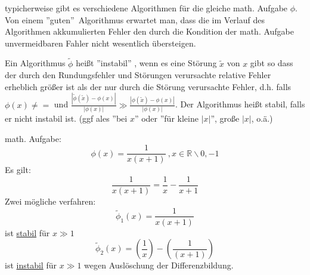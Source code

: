 \documentclass[../Skript.tex]{subfiles}
\begin{document}
\begin{remark} typicherweise gibt es verschiedene Algorithmen für die gleiche math. Aufgabe $\phi$. Von einem ''guten''\ Algorithmus erwartet man, dass die im Verlauf des Algorithmen akkumulierten Fehler den durch die Kondition der math. Aufgabe unvermeidbaren Fahler nicht wesentlich übersteigen.
\end{remark}
\begin{definition}
     Ein Algorithmus $\tilde{\phi}$ heißt ''instabil'' , wenn es eine Störung $\tilde{x}$ von $x$ gibt so dass der durch den Rundungsfehler und Störungen verursachte relative Fehler erheblich größer ist als der nur durch die Störung verursachte Fehler, d.h. falls $\phi(x) \neq = $ und $\displaystyle\frac{|\tilde{\phi}(\tilde{x})-\phi(x)|}{|\phi(x)|}\gg \displaystyle\frac{|\phi(\tilde{x})-\phi(x)|}{|\phi(x)|} $.
    Der Algorithmus heißt stabil, falls er nicht instabil ist. (ggf ales ''bei $x$'' oder ''für kleine $|x|$'', große $|x|$, o.ä.)
\end{definition}
\begin{example}
    math. Aufgabe: $$\phi(x)=\frac{1}{x(x+1)} \ , x \in \mathbb{R}\backslash {0,-1}$$
    Es gilt: $$\frac{1}{x(x+1)}=\frac{1}{x}-\frac{1}{x+1}$$
    Zwei mögliche verfahren:$$\tilde{\phi}_1(x)=\frac{1}{x(x+1)}$$ ist \underline{stabil} für $x\gg 1$
    $$\tilde{\phi}_2 (x)= \left(\frac{1}{x}\right)-\left(\frac{1}{(x+1)}\right)$$ ist 
    \underline{instabil} für $x \gg 1$ wegen Auslöschung der Differenzbildung.
\end{example}
\end{document}
